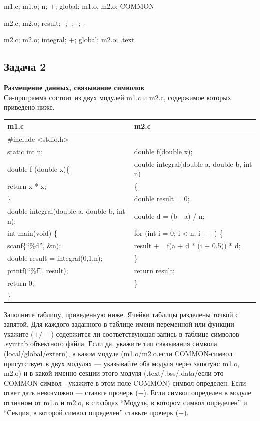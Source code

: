 \documentclass[12pt, letterpaper]{article}
\begin{document}
m1.c; m1.o; n; $+$; global; m1.o, m2.o; COMMON

m2.c; m2.o; result; -; -; -; -

m2.c; m2.o; integral; $+$; global; m2.o; .text\\
\newpage
\subsection{Задача 2}
\textbf{Размещение данных, связывание символов}\\
Си-программа состоит из двух модулей m1.c и m2.c, содержимое которых приведено ниже.
\begin{center}
    \begin{tabular}{|l||l|}
        \hline
        m1.c & m2.c\\
        \hline
        \hline
        \#include <stdio.h> \\                    
        static int n;                                  & double f(double x); \\
        double f (double x)\{                   & double integral(double a, double b, int n) \\
            return x * x;                       & \{ \\
        \}                                      & double result = 0; \\
        double integral(double a, double b, int n);    & double d = (b - a) / n; \\
        int main(void) \{                       & for (int i = 0; i < n; i$++$) \{ \\
            scanf\{``\%d'', \&n);               & result $+$= f(a + d * (i + 0.5)) * d; \\
            double result = integral(0,1,n);      & \} \\
            printf(``\%f'', result);            & return result; \\
            return 0;                           & \} \\
        \}                                      & \\
        \hline
    \end{tabular}
\end{center}
Заполните таблицу, приведенную ниже. Ячейки таблицы разделены точкой с запятой. Для каждого заданного в таблице имени переменной или функции укажите ($+/-$) содержится ли соответствующая запись в таблице символов .symtab объектного файла. Если да, укажите тип связывания символа (local/global/extern), в каком модуле (m1.o/m2.o.если COMMON-символ присутствует в двух модулях — указывайте оба модуля через запятую: m1.o, m2.o) и в какой именно секции этого модуля (.text/.bss/.data/если это COMMON-символ - укажите в этом поле COMMON) символ определен. Если ответ дать невозможно — ставьте прочерк ($-$). Если символ определен в модуле отличном от m1.o и m2.o, в столбцах ``Модуль, в котором символ определен'' и ``Секция, в которой символ определен'' ставьте прочерк ($-$).
\end{document}
